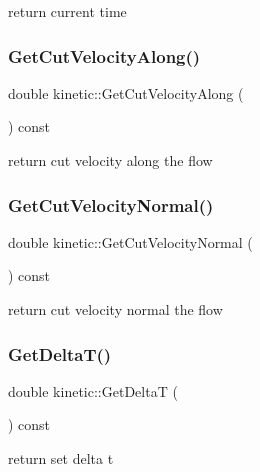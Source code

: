 return current time 

\mbox{\label{classkinetic_a66377a85ab8a6672fa84c1c03a9a0c2a}} 
\subsubsection{\texorpdfstring{Get\+Cut\+Velocity\+Along()}{GetCutVelocityAlong()}}
{\footnotesize\ttfamily double kinetic\+::\+Get\+Cut\+Velocity\+Along (\begin{DoxyParamCaption}{ }\end{DoxyParamCaption}) const}



return cut velocity along the flow 

\mbox{\label{classkinetic_a9ee5f7ffa87b177cda2532ffc56ac1ed}} 
\subsubsection{\texorpdfstring{Get\+Cut\+Velocity\+Normal()}{GetCutVelocityNormal()}}
{\footnotesize\ttfamily double kinetic\+::\+Get\+Cut\+Velocity\+Normal (\begin{DoxyParamCaption}{ }\end{DoxyParamCaption}) const}



return cut velocity normal the flow 

\mbox{\label{classkinetic_a99d22d7ef6a68fb16f1873ba0a91e55b}} 
\subsubsection{\texorpdfstring{Get\+Delta\+T()}{GetDeltaT()}}
{\footnotesize\ttfamily double kinetic\+::\+Get\+DeltaT (\begin{DoxyParamCaption}{ }\end{DoxyParamCaption}) const}



return set delta t 

